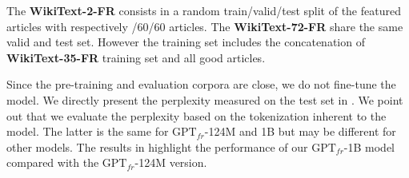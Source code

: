 The \textbf{WikiText-2-FR} consists in a random train/valid/test split of the featured articles with respectively /60/60 articles. The \textbf{WikiText-72-FR} share the same valid and test set. However the training set includes the concatenation of \textbf{WikiText-35-FR} training set and all good articles.

\begin{table}[!ht]
\footnotesize
{}
\caption{Descriptive statistics for the corpora \textbf{WikiText-FR}. We evaluate the vocabulary size using the MOSES tokenizer \parencite{koehn_07}. Tokens out of vocabulary correspond to those that occur fewer than three times.}
\end{table}

Since the pre-training and evaluation corpora are close, we do not fine-tune the model. We directly present the perplexity measured on the test set in . We point out that we evaluate the perplexity based on the tokenization inherent to the model. The latter is the same for $\text{GPT}_{fr}$-124M and 1B but may be different for other models. The results in  highlight the performance of our $\text{GPT}_{fr}$-1B model compared with the $\text{GPT}_{fr}$-124M version.


